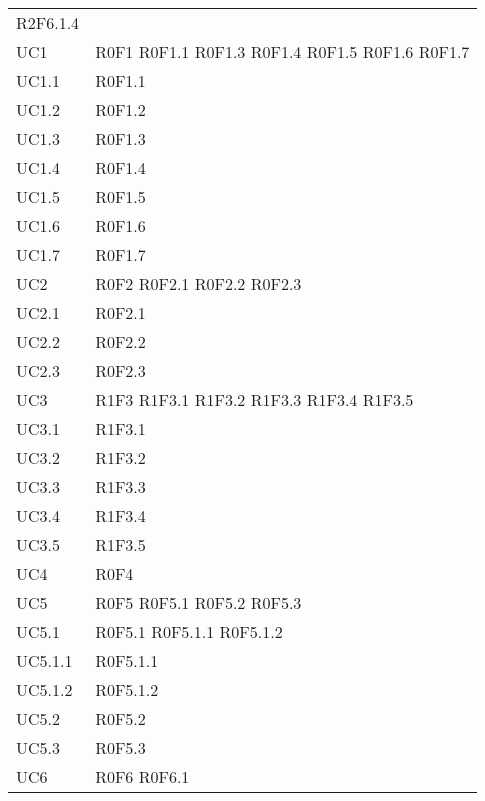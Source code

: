 \begin{longtable}{p{2.5cm}!{\VRule[1pt]}p{5.5cm}}
R2F6.1.4 \\
UC1 & R0F1 
	\newline R0F1.1
	\newline R0F1.3
	\newline R0F1.4
	\newline R0F1.5
	\newline R0F1.6
	\newline R0F1.7\\
UC1.1 & R0F1.1\\
UC1.2 & R0F1.2\\
UC1.3 & R0F1.3\\
UC1.4 & R0F1.4\\
UC1.5 & R0F1.5\\
UC1.6 & R0F1.6\\
UC1.7 & R0F1.7\\
UC2 & R0F2
	\newline R0F2.1
	\newline R0F2.2
	\newline R0F2.3\\
UC2.1 & R0F2.1\\
UC2.2 & R0F2.2\\
UC2.3 & R0F2.3\\
UC3 & R1F3
	\newline R1F3.1
	\newline R1F3.2
	\newline R1F3.3
	\newline R1F3.4
	\newline R1F3.5\\
UC3.1 & R1F3.1\\
UC3.2 & R1F3.2\\
UC3.3 & R1F3.3\\
UC3.4 & R1F3.4\\
UC3.5 & R1F3.5\\
UC4 & R0F4\\
UC5 & R0F5
	\newline R0F5.1
	\newline R0F5.2
	\newline R0F5.3\\
UC5.1 & R0F5.1
	\newline R0F5.1.1
	\newline R0F5.1.2\\	
UC5.1.1 & R0F5.1.1\\
UC5.1.2 & R0F5.1.2\\
UC5.2 & R0F5.2\\
UC5.3 & R0F5.3\\
UC6 & R0F6
	\newline R0F6.1

\end{longtable}
